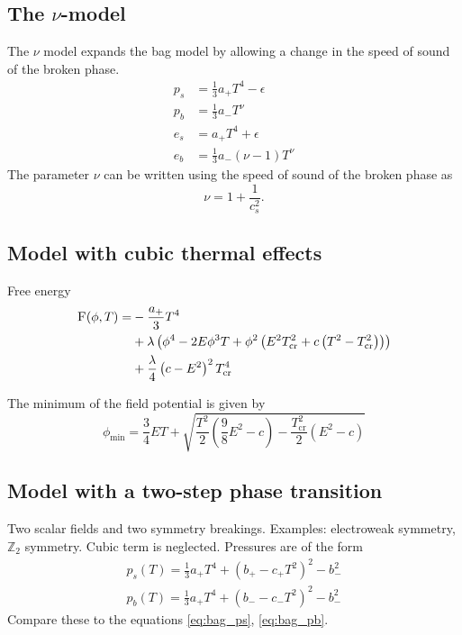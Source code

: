 \subsection{The $\nu$-model}
The $\nu$ model expands the bag model by allowing a change in the speed of sound of the broken phase.
\cite[eq. 38]{giese_2020}
\begin{align}
p_s &= \frac{1}{3} a_+ T^4 - \epsilon \\
p_b &= \frac{1}{3} a_- T^\nu \\
e_s &= a_+ T^4 + \epsilon \\
e_b &= \frac{1}{3} a_- (\nu - 1) T^\nu
\end{align}
The parameter $\nu$ can be written using the speed of sound of the broken phase as
\cite[eq. 39]{giese_2020}
\begin{equation}
\nu = 1 + \frac{1}{c_s^2}.
\end{equation}

\subsection{Model with cubic thermal effects}
Free energy
\cite[eq. 45]{giese_2020}
\begin{align}
\begin{split}
\textsc{F}(\phi, T) =
&- \frac{a_+}{3} T^4 \\
&+ \lambda \left( \phi^4 - 2E\phi^3 T + \phi^2 \left( E^2 T_\text{cr}^2 + c \left( T^2 - T_\text{cr}^2 \right) \right) \right) \\
&+ \frac{\lambda}{4} \left( c - E^2 \right)^2 T_\text{cr}^4
\end{split}
\end{align}

The minimum of the field potential is given by
\cite[eq. 46]{giese_2020}
\begin{equation}
\phi_\text{min} = \frac{3}{4} ET + \sqrt{\frac{T^2}{2}(\frac{9}{8}E^2 - c) - \frac{T_\text{cr}^2}{2} (E^2 - c)}
\end{equation}

\subsection{Model with a two-step phase transition}
Two scalar fields and two symmetry breakings. Examples: electroweak symmetry, $\mathbb{Z}_2$ symmetry.
Cubic term is neglected.
Pressures are of the form
\cite[eq. 47-48]{giese_2020}
\begin{align}
p_s(T) = \frac{1}{3}a_+ T^4 + (b_+ - c_+ T^2)^2 - b_-^2 \\
p_b(T) = \frac{1}{3}a_+ T^4 + (b_- - c_-T^2)^2 - b_-^2
\end{align}
Compare these to the equations \ref{eq:bag_ps}, \ref{eq:bag_pb}.



